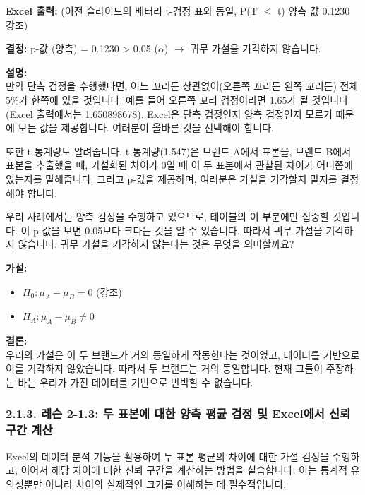 \documentclass[11pt,a4paper]{article}
\theoremstyle{definition}
\begin{document}
\begin{infobox}[title=Excel 워크시트 (8/9): p-값 기반 최종 결정]
\textbf{Excel 출력:} (이전 슬라이드의 배터리 t-검정 표와 동일, P(T $\le$ t) 양측 값 0.1230 강조)

\textbf{결정:}
p-값 (양측) = 0.1230 > 0.05 ($\alpha$) $\rightarrow$ 귀무 가설을 기각하지 않습니다.

\textbf{설명:} \\
만약 단측 검정을 수행했다면, 어느 꼬리든 상관없이(오른쪽 꼬리든 왼쪽 꼬리든) 전체 5\%가 한쪽에 있을 것입니다. 예를 들어 오른쪽 꼬리 검정이라면 1.65가 될 것입니다 (Excel 출력에서는 1.650898678). Excel은 단측 검정인지 양측 검정인지 모르기 때문에 모든 값을 제공합니다. 여러분이 올바른 것을 선택해야 합니다.

또한 t-통계량도 알려줍니다. t-통계량(1.547)은 브랜드 A에서 표본을, 브랜드 B에서 표본을 추출했을 때, 가설화된 차이가 0일 때 이 두 표본에서 관찰된 차이가 어디쯤에 있는지를 말해줍니다. 그리고 p-값을 제공하며, 여러분은 가설을 기각할지 말지를 결정해야 합니다.

우리 사례에서는 양측 검정을 수행하고 있으므로, 테이블의 이 부분에만 집중할 것입니다. 이 p-값을 보면 0.05보다 크다는 것을 알 수 있습니다. 따라서 귀무 가설을 기각하지 않습니다. 귀무 가설을 기각하지 않는다는 것은 무엇을 의미할까요?
\end{infobox}

\begin{infobox}[title=Excel 워크시트 (9/9): 최종 결론 도출]
\textbf{가설:}
\begin{itemize}
    \item $H_0 : \mu_A - \mu_B = 0$ (강조)
    \item $H_A : \mu_A - \mu_B \neq 0$
\end{itemize}
\textbf{결론:} \\
우리의 가설은 이 두 브랜드가 거의 동일하게 작동한다는 것이었고, 데이터를 기반으로 이를 기각하지 않았습니다. 따라서 두 브랜드는 거의 동일합니다. 현재 그들이 주장하는 바는 우리가 가진 데이터를 기반으로 반박할 수 없습니다.
\end{infobox}

\newpage
\subsubsection*{2.1.3. 레슨 2-1.3: 두 표본에 대한 양측 평균 검정 및 Excel에서 신뢰 구간 계산}

\begin{summarybox}[title=핵심 요약: 가설 검정 후 신뢰 구간 계산]
Excel의 데이터 분석 기능을 활용하여 두 표본 평균의 차이에 대한 가설 검정을 수행하고, 이어서 해당 차이에 대한 신뢰 구간을 계산하는 방법을 실습합니다. 이는 통계적 유의성뿐만 아니라 차이의 실제적인 크기를 이해하는 데 필수적입니다.
\end{summarybox}
\end{document}
